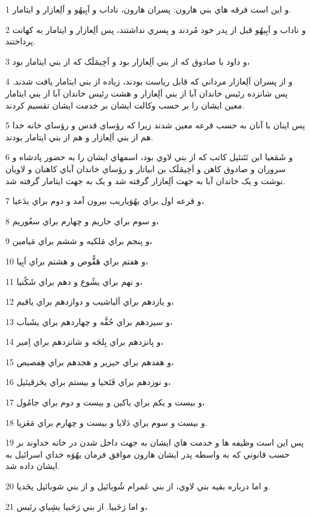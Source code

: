 \par 1 و اين است فرقه هاي بني هارون: پسران هارون، ناداب و اَبِيهُو و اَلِعازار و ايتامار.
\par 2 و ناداب و اَبِيهُو قبل از پدر خود مُردند و پسري نداشتند، پس اَلِعازار و ايتامار به کهانت پرداختند.
\par 3 و داود با صادوق که از بني اَلِعازار بود و اَخِيمَلَک که از بني ايتامار بود،
\par 4 و از پسران اَلِعازار مرداني که قابل رياست بودند، زياده از بني ايتامار يافت شدند. پس شانزده رئيس خاندان آبا از بني اَلِعازار و هشت رئيس خاندان آبا از بني ايتامار معين ايشان را بر حسب وکالت ايشان بر خدمت ايشان تقسيم کردند.
\par 5 پس اينان با آنان به حسب قرعه معين شدند زيرا که رؤساي قدس و رؤساي خانه خدا هم از بني اَلِعازار و هم از بني ايتامار بودند.
\par 6 و شَمَعيا ابن نَتَنئيل کاتب که از بني لاوي بود، اسمهاي ايشان را به حضور پادشاه و سروران و صادوق کاهن و اَخِيمَلَک بن ابياتار و رؤساي خاندان آباي کاهنان و لاويان نوشت و يک خاندان آبا به جهت اَلِعازار گرفته شد و يک به جهت ايتامار گرفته شد.
\par 7 و قرعه اول براي يهُوَياريب بيرون آمد و دوم براي يدَعيا،
\par 8 و سوم براي حاريم و چهارم براي سعُوريم،
\par 9 و پنجم براي مَلکيه و ششم براي مَيامين،
\par 10 و هفتم براي هَقُّوص و هشتم براي اَبِيا،
\par 11 و نهم براي يشُوع و دهم براي شَکُنيا،
\par 12 و يازدهم براي اَلياشيب و دوازدهم براي ياقيم،
\par 13 و سيزدهم براي حُفَّه و چهاردهم براي يشَبآب،
\par 14 و پانزدهم براي بِلجَه و شانزدهم براي اِمير،
\par 15 و هفدهم براي حيزير و هجدهم براي هِفصيص،
\par 16 و نوزدهم براي فَتَحيا و بيستم براي يحَزقيئيل،
\par 17 و بيست و يکم براي ياکين و بيست و دوم براي جامُول،
\par 18 و بيست و سوم براي دَلايا و بيست و چهارم براي مَعَزيا.
\par 19 پس اين است وظيفه ها و خدمت هاي ايشان به جهت داخل شدن در خانه خداوند بر حسب قانوني که به واسطه پدر ايشان هارون موافق فرمان يهُوَه خداي اسرائيل به ايشان داده شد.
\par 20 و اما درباره بقيه بني لاوي، از بني عَمرام شُوبائيل و از بني شوبائيل يحَديا.
\par 21 و اما رَحَبيا. از بني رَحَبيا يشِياي رئيس،
